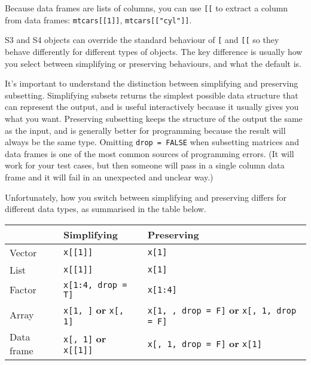 Because data frames are lists of columns, you can use \texttt{{[}{[}} to
extract a column from data frames: \texttt{mtcars{[}{[}1{]}{]}},
\texttt{mtcars{[}{[}"cyl"{]}{]}}. 

S3 and S4 objects can override the standard behaviour of \texttt{{[}}
and \texttt{{[}{[}} so they behave differently for different types of
objects. The key difference is usually how you select between
simplifying or preserving behaviours, and what the default is.


It's important to understand the distinction between simplifying and
preserving subsetting. Simplifying subsets returns the simplest possible
data structure that can represent the output, and is useful
interactively because it usually gives you what you want. Preserving
subsetting keeps the structure of the output the same as the input, and
is generally better for programming because the result will always be
the same type. Omitting \texttt{drop = FALSE} when subsetting matrices
and data frames is one of the most common sources of programming errors.
(It will work for your test cases, but then someone will pass in a
single column data frame and it will fail in an unexpected and unclear
way.)  

Unfortunately, how you switch between simplifying and preserving differs
for different data types, as summarised in the table below.

\begin{longtable}[c]{@{}lll@{}}
\toprule
& Simplifying & Preserving\tabularnewline
\midrule
\endhead
Vector & \texttt{x{[}{[}1{]}{]}} & \texttt{x{[}1{]}}\tabularnewline
List & \texttt{x{[}{[}1{]}{]}} & \texttt{x{[}1{]}}\tabularnewline
Factor & \texttt{x{[}1:4, drop = T{]}} &
\texttt{x{[}1:4{]}}\tabularnewline
Array & \texttt{x{[}1, {]}} \textbf{or} \texttt{x{[}, 1{]}} &
\texttt{x{[}1, , drop = F{]}} \textbf{or}
\texttt{x{[}, 1, drop = F{]}}\tabularnewline
Data frame & \texttt{x{[}, 1{]}} \textbf{or} \texttt{x{[}{[}1{]}{]}} &
\texttt{x{[}, 1, drop = F{]}} \textbf{or}
\texttt{x{[}1{]}}\tabularnewline
\bottomrule
\end{longtable}


